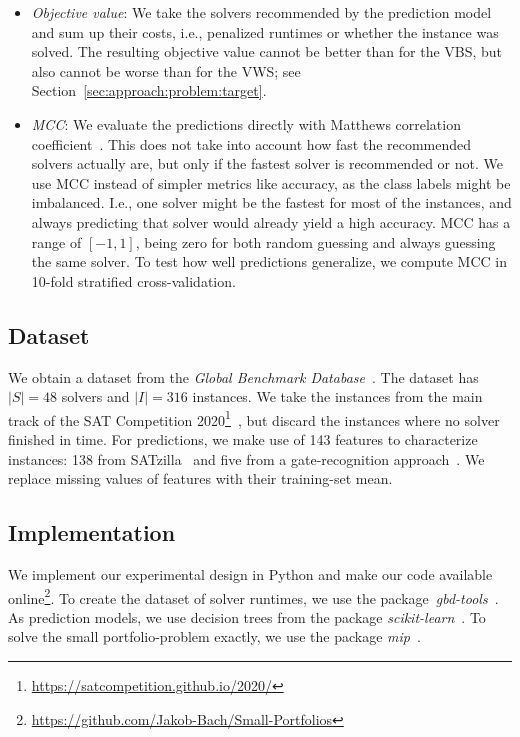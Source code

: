 \documentclass[conference]{IEEEtran}
\begin{document}
\begin{itemize}
	\item \emph{Objective value}:
	We take the solvers recommended by the prediction model and sum up their costs, i.e., penalized runtimes or whether the instance was solved.
	The resulting objective value cannot be better than for the VBS, but also cannot be worse than for the VWS; see Section~\ref{sec:approach:problem:target}.
	\item \emph{MCC}:
	We evaluate the predictions directly with Matthews correlation coefficient~\cite{matthews1975comparison, gorodkin2004comparing}.
	This does not take into account how fast the recommended solvers actually are, but only if the fastest solver is recommended or not.
	We use MCC instead of simpler metrics like accuracy, as the class labels might be imbalanced.
	I.e., one solver might be the fastest for most of the instances, and always predicting that solver would already yield a high accuracy.
	MCC has a range of $[-1,1]$, being zero for both random guessing and always guessing the same solver.
	To test how well predictions generalize, we compute MCC in 10-fold stratified cross-validation.
\end{itemize}

\subsection{Dataset}

We obtain a dataset from the \emph{Global Benchmark Database}~\cite{iser2020collaborative}.
The dataset has $|S| = 48$ solvers and $|I| = 316$ instances.
We take the instances from the main track of the SAT Competition 2020\footnote{\url{https://satcompetition.github.io/2020/}}~\cite{balyo2020proceedings}, but discard the instances where no solver finished in time.
For predictions, we make use of 143 features to characterize instances:
138 from SATzilla~\cite{xu2008satzilla, xu2012satzilla2012} and five from a gate-recognition approach~\cite{iser2020recognition}.
We replace missing values of features with their training-set mean.


\subsection{Implementation}

We implement our experimental design in Python and make our code available online\footnote{\url{https://github.com/Jakob-Bach/Small-Portfolios}}.
To create the dataset of solver runtimes, we use the package~\emph{gbd-tools}~\cite{iser2020collaborative}.
As prediction models, we use decision trees from the package \emph{scikit-learn}~\cite{scikit-learn}.
To solve the small portfolio-problem exactly, we use the package \emph{mip}~\cite{python-mip}.
\end{document}
